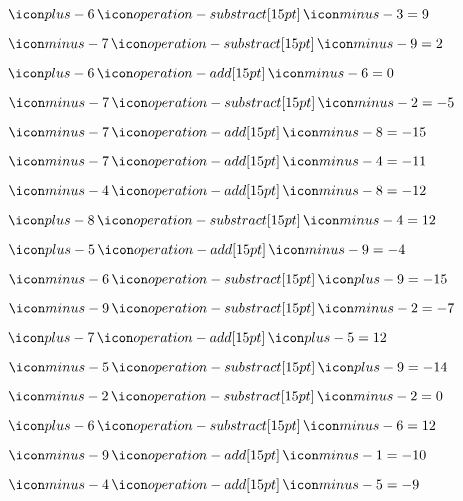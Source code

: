 {{\item$\six \minus \mthree = 9$

\item$\mseven \minus \mnine = 2$

\item$\six \plus \msix = 0$

\item$\mseven \minus \mtwo = -5$

\item$\mseven \plus \meight = -15$

\item$\mseven \plus \mfour = -11$

\item$\mfour \plus \meight = -12$

\item$\eight \minus \mfour = 12$

\item$\five \plus \mnine = -4$

\item$\msix \minus \nine = -15$

\item$\mnine \minus \mtwo = -7$

\item$\seven \plus \five = 12$

\item$\mfive \minus \nine = -14$

\item$\mtwo \minus \mtwo = 0$

\item$\six \minus \msix = 12$

\item$\mnine \plus \mone = -10$

\item$\mfour \plus \mfive = -9$

}}